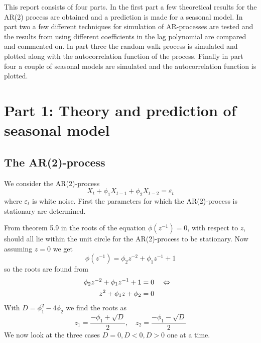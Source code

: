 \def\assignmenttitle{Simulation of AR(p) and Seasonal processes}
\def\assignmentnumber{2}
\def\assignmentdate{11-10-2011}





\maketitle

This report consists of four parts. In the first part a few theoretical results for the AR(2) process are obtained and a prediction is made for a seasonal model. In part two a few different techniques for simulation of AR-processes are tested and the results from using different coefficients in the lag polynomial are compared and commented on. In part three the random walk process is simulated and plotted along with the autocorrelation function of the process. Finally in part four a couple of seasonal models are simulated and the autocorrelation function is plotted.

\section*{Part 1: Theory and prediction of seasonal model}
\subsection*{The AR(2)-process}
We consider the AR(2)-process
\begin{equation*}
    X_t + \phi_1 X_{t-1} + \phi_2 X_{t-2} = \varepsilon_t
\end{equation*}
where $\varepsilon_t$ is white noise. First the parameters for which the AR(2)-process is stationary are determined. \par

From theorem 5.9 in \cite{hm} the roots of the equation $\phi(z^{-1})=0$, with respect to $z$, should all lie within the unit circle for the AR(2)-process to be stationary. Now assuming $z=0$ we get
\begin{equation*}
    \phi(z^{-1}) = \phi_2 z^{-2} + \phi_1 z^{-1} + 1
\end{equation*}
so the roots are found from
\begin{align*}
    \phi_2 z^{-2} + \phi_1 z^{-1} + 1 &= 0 \quad\Leftrightarrow\quad \\
    z^2 + \phi_1 z + \phi_2 &= 0
\end{align*}
With $D = \phi_1^2 - 4\phi_2$ we find the roots as
\begin{equation*}
    z_1 = \frac{-\phi_1 + \sqrt{D}}{2},\quad z_2 = \frac{-\phi_1 - \sqrt{D}}{2}
\end{equation*}
We now look at the three cases $D=0, D<0, D>0$ one at a time. \par

